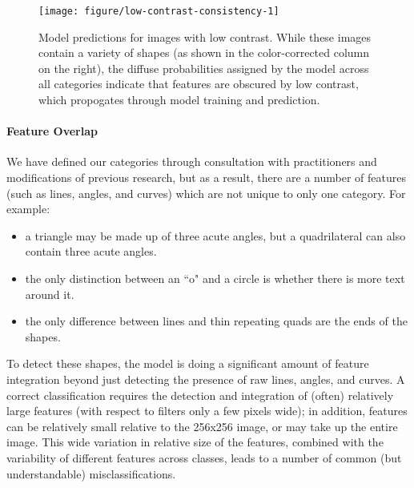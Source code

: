 \documentclass{article}\usepackage[]{graphicx}\usepackage[table]{xcolor}
\newenvironment{knitrout}{}{} %
\begin{document}
\begin{knitrout}
\color{fgcolor}\begin{figure}[p!]

{\centering \texttt{[image: figure/low-contrast-consistency-1]} 

}

\caption[Model predictions for images with low contrast]{Model predictions for images with low contrast. While these images contain a variety of shapes (as shown in the color-corrected column on the right), the diffuse probabilities assigned by the model across all categories indicate that features are obscured by low contrast, which propogates through model training and prediction.}\label{fig:low-contrast-consistency}
\end{figure}


\end{knitrout}

\paragraph{Feature Overlap}
We have defined our categories through consultation with practitioners and modifications of previous research, but as a result, there are a number of features (such as lines, angles, and curves) which are not unique to only one category. For example:
\begin{itemize}
\item a triangle may be made up of three acute angles, but a quadrilateral can also contain three acute angles.
\item the only distinction between an ``o" and a circle is whether there is more text around it.
\item the only difference between lines and thin repeating quads are the ends of the shapes.
\end{itemize}

To detect these shapes, the model is doing a significant amount of feature integration beyond just detecting the presence of raw lines, angles, and curves. A correct classification requires the detection and integration of (often) relatively large features (with respect to filters only a few pixels wide); in addition, features can be relatively small relative to the 256x256 image, or may take up the entire image. This wide variation in relative size of the features, combined with the variability of different features across classes, leads to a number of common (but understandable) misclassifications.
\end{document}
